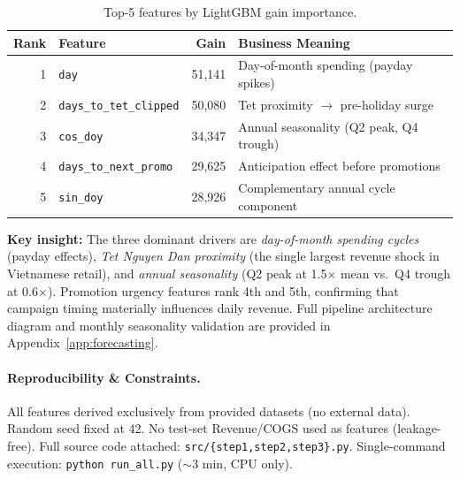 \documentclass{article}
\begin{document}
\vspace{-2pt}
\begin{table}[htbp]
  \caption{Top-5 features by LightGBM gain importance.}
  \label{tab:feat}
  \centering
  \small
  \begin{tabular}{@{}rlrl@{}}
    \toprule
    \textbf{Rank} & \textbf{Feature} & \textbf{Gain} & \textbf{Business Meaning} \\
    \midrule
    1 & \texttt{day} & 51{,}141 & Day-of-month spending (payday spikes) \\
    2 & \texttt{days\_to\_tet\_clipped} & 50{,}080 & Tet proximity $\to$ pre-holiday surge \\
    3 & \texttt{cos\_doy} & 34{,}347 & Annual seasonality (Q2 peak, Q4 trough) \\
    4 & \texttt{days\_to\_next\_promo} & 29{,}625 & Anticipation effect before promotions \\
    5 & \texttt{sin\_doy} & 28{,}926 & Complementary annual cycle component \\
    \bottomrule
  \end{tabular}
\end{table}
\vspace{-2pt}

\textbf{Key insight:} The three dominant drivers are \emph{day-of-month spending cycles} (payday effects), \emph{Tet Nguyen Dan proximity} (the single largest revenue shock in Vietnamese retail), and \emph{annual seasonality} (Q2 peak at 1.5$\times$ mean vs.\ Q4 trough at 0.6$\times$). Promotion urgency features rank 4th and 5th, confirming that campaign timing materially influences daily revenue. Full pipeline architecture diagram and monthly seasonality validation are provided in Appendix~\ref{app:forecasting}.

\paragraph{Reproducibility \& Constraints.}
All features derived exclusively from provided datasets (no external data). Random seed fixed at 42. No test-set Revenue/COGS used as features (leakage-free). Full source code attached: \texttt{src/\{step1,step2,step3\}.py}. Single-command execution: \texttt{python run\_all.py} ($\sim$3 min, CPU only).

\newpage
\end{document}
